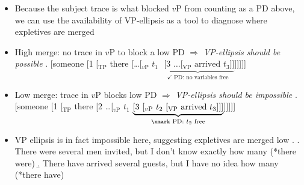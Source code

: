 \documentclass[letterpaper,10pt]{handout_nick}
\begin{document}
\begin{itemize}
\begin{itemize}
\item Because the subject trace is what blocked $v$P from counting as a PD above, we can use the availability of VP-ellipsis as a tool to diagnose where expletives are merged
\item High merge: no trace in $v$P to block a low PD $\Rightarrow$ \emph{VP-ellipsis should be possible}
\ex. [someone [1 [$_\text{TP}$ there [\ldots [$_\text{$v$P}$ $t_1$ $\underbrace{\text{ [3 \ldots [$_\text{VP}$ arrived $t_3$]]}}_\text{$\checkmark$ PD: no variables free}$]]]]]

\item Low merge: trace in $v$P blocks low PD $\Rightarrow$ \emph{VP-ellipsis should be impossible}
\ex. [someone [1 [$_\text{TP}$ there [2 \ldots [$_\text{$v$P}$ $t_1$ $\underbrace{\text{[3 [$_\text{$v$P}$ $t_2$ [$_\text{VP}$ arrived $t_3$]]]}}_\text{\xmark\ PD: $t_2$ free}$]]]]]

\item VP ellipsis is in fact impossible here, suggesting expletives are merged low
\ex. \a. There were several men invited, but I don't know exactly how many (*there were)
\b. There have arrived several guests, but I have no idea how many (*there have)

\end{itemize}

\end{itemize}
\end{document}
